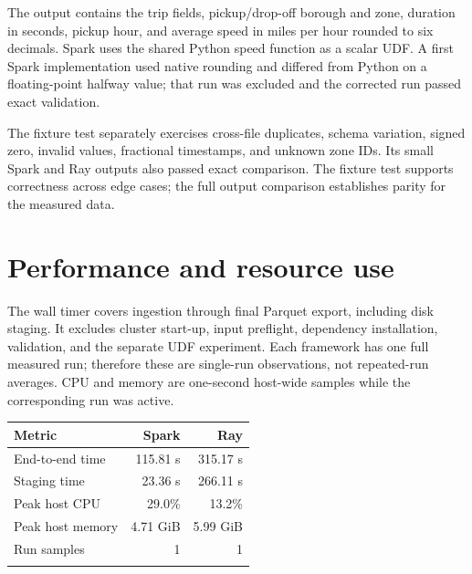 \documentclass[10pt]{article}
\begin{document}
The output contains the trip fields, pickup/drop-off borough and zone, duration in seconds, pickup hour, and average speed in miles per hour rounded to six decimals. Spark uses the shared Python speed function as a scalar UDF. A first Spark implementation used native rounding and differed from Python on a floating-point halfway value; that run was excluded and the corrected run passed exact validation.

\begin{center}
\end{center}

The fixture test separately exercises cross-file duplicates, schema variation, signed zero, invalid values, fractional timestamps, and unknown zone IDs. Its small Spark and Ray outputs also passed exact comparison. The fixture test supports correctness across edge cases; the full output comparison establishes parity for the measured data.

\section*{Performance and resource use}
The wall timer covers ingestion through final Parquet export, including disk staging. It excludes cluster start-up, input preflight, dependency installation, validation, and the separate UDF experiment. Each framework has one full measured run; therefore these are single-run observations, not repeated-run averages. CPU and memory are one-second host-wide samples while the corresponding run was active.

\begin{center}
\small
\begin{tabular}{@{}lrr@{}}
\hline
\textbf{Metric} & \textbf{Spark} & \textbf{Ray}\\
\hline
End-to-end time & 115.81 s & 315.17 s\\
Staging time & 23.36 s & 266.11 s\\
Peak host CPU & 29.0\% & 13.2\%\\
Peak host memory & 4.71 GiB & 5.99 GiB\\
Run samples & 1 & 1\\
\\\hline
\end{tabular}
\end{center}
\end{document}
